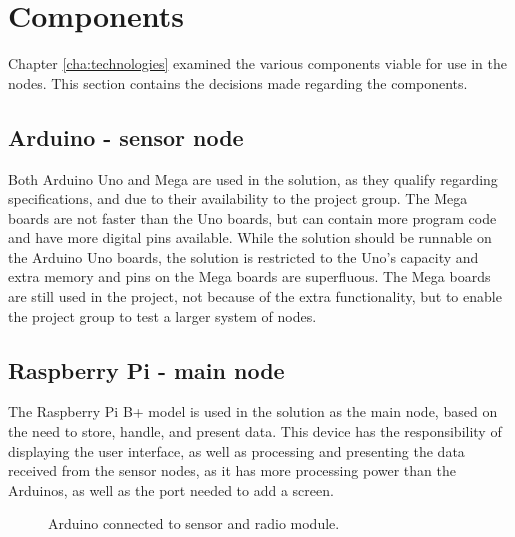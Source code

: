 \section{Components}
Chapter \ref{cha:technologies} examined the various components viable for use in the nodes. This section contains the decisions made regarding the components.

\subsection*{Arduino - sensor node}
Both Arduino Uno and Mega are used in the solution, as they qualify regarding specifications, and due to their availability to the project group. The Mega boards are not faster than the Uno boards, but can contain more program code and have more digital pins available. While the solution should be runnable on the Arduino Uno boards, the solution is restricted to the Uno's capacity and extra memory and pins on the Mega boards are superfluous. The Mega boards are still used in the project, not because of the extra functionality, but to enable the project group to test a larger system of nodes.

\subsection*{Raspberry Pi - main node}
The Raspberry Pi B+ model is used in the solution as the main node, based on the need to store, handle, and present data. This device has the responsibility of displaying the user interface, as well as processing and presenting the data received from the sensor nodes, as it has more processing power than the Arduinos, as well as the port needed to add a screen.


\begin{figure}[!h]
	\centering
	\caption{Arduino connected to sensor and radio module.}
	\label{fig:compsketch}
\end{figure}

